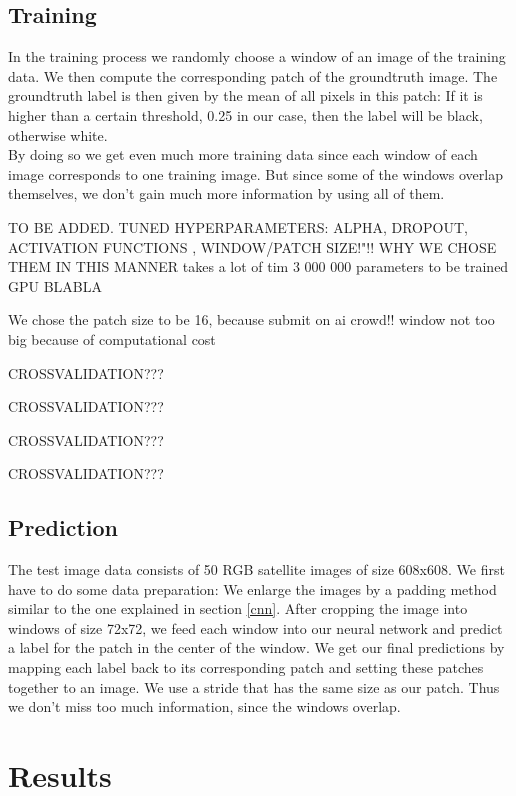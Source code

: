 \documentclass[10pt,conference,compsocconf]{IEEEtran}
\begin{document}
\subsection{Training}

In the training process we randomly choose a window of an image of the training data. We then compute the corresponding patch of the groundtruth image. The groundtruth label is then given by the mean of all pixels in this patch: If it is higher than a certain threshold, 0.25 in our case, then the label will be black, otherwise white.\\
By doing so we get even much more training data since each window of each image corresponds to one training image. But since some of the windows overlap themselves, we don't gain much more information by using all of them.


TO BE ADDED. TUNED HYPERPARAMETERS: ALPHA, DROPOUT, ACTIVATION FUNCTIONS , WINDOW/PATCH SIZE!"!! WHY WE CHOSE THEM IN THIS MANNER
takes a lot of tim 3 000 000 parameters to be trained
GPU BLABLA

We chose the patch size to be 16, because submit on ai crowd!! window not too big because of computational cost

CROSSVALIDATION???

CROSSVALIDATION???

CROSSVALIDATION???

CROSSVALIDATION???

\subsection{Prediction}

The test image data consists of 50 RGB satellite images of size 608x608. We first have to do some data preparation: We enlarge the images by a padding method similar to the one explained in section \ref{cnn}. After cropping the image into windows of size 72x72, we feed each window into our neural network and predict a label for the patch in the center of the window. We get our final predictions by mapping each label back to its corresponding patch and setting these patches together to an image.
We use a stride that has the same size as our patch. Thus we don't miss too much information, since the windows overlap.


\section{Results}
\end{document}
